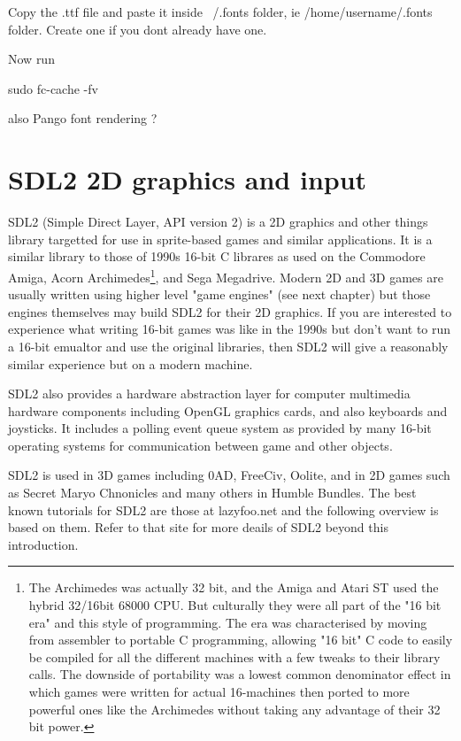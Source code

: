 \documentclass[oneside,english]{scrbook}
\begin{document}
Copy the .ttf file and paste it inside ~/.fonts folder, ie /home/username/.fonts folder. Create one if you dont already have one.

Now run

sudo fc-cache -fv


also Pango font rendering ?





\chapter{SDL2 2D graphics and input}

SDL2 (Simple Direct Layer, API version 2) is a 2D graphics and other things library targetted for use in sprite-based games and similar applications.  It is a similar library to those of 1990s 16-bit C librares as used on the Commodore Amiga, Acorn Archimedes\footnote{The Archimedes was actually 32 bit, and the Amiga and Atari ST used the hybrid 32/16bit 68000 CPU. But culturally they were all part of the "16 bit era" and this style of programming.  The era was characterised by moving from assembler to portable C programming, allowing "16 bit" C code to easily be compiled for all the different machines with a few tweaks to their library calls.  The downside of portability was a lowest common denominator effect in which games were written for actual 16-machines then ported to more powerful ones like the Archimedes without taking any advantage of their 32 bit power. }, and Sega Megadrive.  Modern 2D and 3D games are usually written using higher level "game engines" (see next chapter) but those engines themselves may build SDL2 for their 2D graphics.  If you are interested to experience what writing 16-bit games was like in the 1990s but don't want to run a 16-bit emualtor and use the original libraries, then SDL2 will give a reasonably similar experience but on a modern machine. 

SDL2 also provides a hardware abstraction layer for computer multimedia hardware components including OpenGL graphics cards, and also keyboards and joysticks. It includes a polling event queue system as provided by many 16-bit operating systems for communication between game and other objects.  

SDL2 is used in 3D games including 0AD, FreeCiv, Oolite, and in 2D games such as Secret Maryo Chnonicles and many others in Humble Bundles.  The best known tutorials for SDL2 are those at lazyfoo.net and the following overview is based on them. Refer to that site for more deails of SDL2 beyond this introduction.
\end{document}
